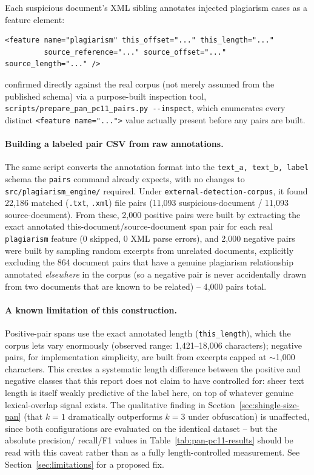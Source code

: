 \documentclass[11pt]{article}
\begin{document}
Each suspicious document's XML sibling annotates injected plagiarism cases as a feature element:

\begin{lstlisting}
<feature name="plagiarism" this_offset="..." this_length="..."
         source_reference="..." source_offset="..." source_length="..." />
\end{lstlisting}

confirmed directly against the real corpus (not merely assumed from the published schema) via a
purpose-built inspection tool, \verb|scripts/prepare_pan_pc11_pairs.py --inspect|, which enumerates every
distinct \texttt{<feature name="...">} value actually present before any pairs are built.

\paragraph{Building a labeled pair CSV from raw annotations.} The same script converts the annotation
format into the \verb|text_a, text_b, label| schema the \texttt{pairs} command already expects, with no
changes to \verb|src/plagiarism_engine/| required. Under \verb|external-detection-corpus|, it found
22{,}186 matched (\texttt{.txt}, \texttt{.xml}) file pairs (11{,}093 suspicious-document / 11{,}093
source-document). From these, 2{,}000 positive pairs were built by extracting the exact annotated
this-document/source-document span pair for each real \texttt{plagiarism} feature (0 skipped, 0 XML parse
errors), and 2{,}000 negative pairs were built by sampling random excerpts from unrelated documents,
explicitly excluding the 864 document pairs that have a genuine plagiarism relationship annotated
\emph{elsewhere} in the corpus (so a negative pair is never accidentally drawn from two documents that are
known to be related) -- 4{,}000 pairs total.

\paragraph{A known limitation of this construction.} Positive-pair spans use the exact annotated length
(\verb|this_length|), which the corpus lets vary enormously (observed range: 1{,}421--18{,}006 characters);
negative pairs, for implementation simplicity, are built from excerpts capped at $\sim$1{,}000 characters.
This creates a systematic length difference between the positive and negative classes that this report
does not claim to have controlled for: sheer text length is itself weakly predictive of the label here, on
top of whatever genuine lexical-overlap signal exists. The qualitative finding in
Section~\ref{sec:shingle-size-pan} (that $k=1$ dramatically outperforms $k=3$ under obfuscation) is
unaffected, since both configurations are evaluated on the identical dataset -- but the absolute precision/
recall/F1 values in Table~\ref{tab:pan-pc11-results} should be read with this caveat rather than as a
fully length-controlled measurement. See Section~\ref{sec:limitations} for a proposed fix.
\end{document}
